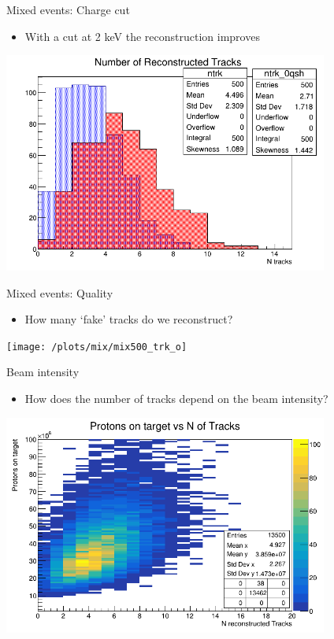 \documentclass[10pt]{beamer}
\begin{document}
%
\begin{frame}{Mixed events: Charge cut}
\begin{itemize}
\item With a cut at 2 keV the reconstruction improves
\end{itemize}
\begin{center}
\includegraphics[width=0.8\textwidth]{plots/mix/mix500_trk_Ps}
\end{center}
\end{frame}

\begin{frame}{Mixed events: Quality}
\begin{itemize}
\item How many `fake' tracks do we reconstruct? 
\end{itemize}
\centering
\texttt{[image: /plots/mix/mix500\_trk\_o]}
\end{frame}

%
\begin{frame}{Beam intensity}
\begin{itemize}
\item How does the number of tracks depend on the beam intensity?
\end{itemize}
\begin{center}
\includegraphics[width=0.8\textwidth]{plots/mix/lum_vs_ntrk}
\end{center}
\end{frame}
\end{document}

